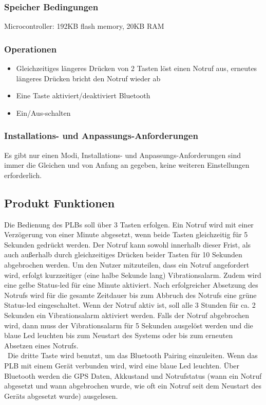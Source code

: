 \subsubsection{Speicher Bedingungen}
Microcontroller: 192KB flash memory, 20KB RAM

\subsubsection{Operationen}
\begin{itemize}
	\item Gleichzeitiges längeres Drücken von 2 Tasten löst einen Notruf aus, erneutes längeres Drücken bricht den Notruf wieder ab
	\item Eine Taste aktiviert/deaktiviert Bluetooth
	\item Ein/Aus-schalten
\end{itemize}

\subsubsection{Installations- und Anpassungs-Anforderungen}
Es gibt nur einen Modi, Installations- und Anpassungs-Anforderungen sind immer die Gleichen und von Anfang an gegeben, keine weiteren Einstellungen erforderlich.

\subsection{Produkt Funktionen}
Die Bedienung des PLBs soll über 3 Tasten erfolgen. Ein Notruf wird mit einer Verzögerung von einer Minute abgesetzt, wenn beide Tasten gleichzeitig für 5 Sekunden gedrückt werden. Der Notruf kann sowohl innerhalb dieser Frist, als auch außerhalb durch gleichzeitiges Drücken beider Tasten für 10 Sekunden abgebrochen werden. 
Um den Nutzer mitzuteilen, dass ein Notruf angefordert wird, erfolgt kurzzeitiger (eine  halbe Sekunde lang) Vibrationsalarm. Zudem wird eine gelbe Status-led für eine Minute aktiviert. Nach erfolgreicher Absetzung des Notrufs wird für die gesamte Zeitdauer bis zum Abbruch des Notrufs eine grüne Status-led eingeschaltet. Wenn der Notruf aktiv ist, soll alle 3 Stunden für ca. 2 Sekunden ein Vibrationsalarm aktiviert werden. Falls der Notruf abgebrochen wird, dann muss der Vibrationsalarm für 5 Sekunden ausgelöst werden und die blaue Led leuchten bis zum Neustart des Systems oder bis zum erneuten Absetzen eines Notrufs.\\\
Die dritte Taste wird benutzt, um das Bluetooth Pairing einzuleiten. Wenn das PLB mit einem Gerät verbunden wird, wird eine blaue Led leuchten. Über Bluetooth werden die GPS Daten, Akkustand und Notrufstatus (wann ein Notruf abgesetzt und wann abgebrochen wurde, wie oft ein Notruf seit dem Neustart des Geräts abgesetzt wurde) ausgelesen.
